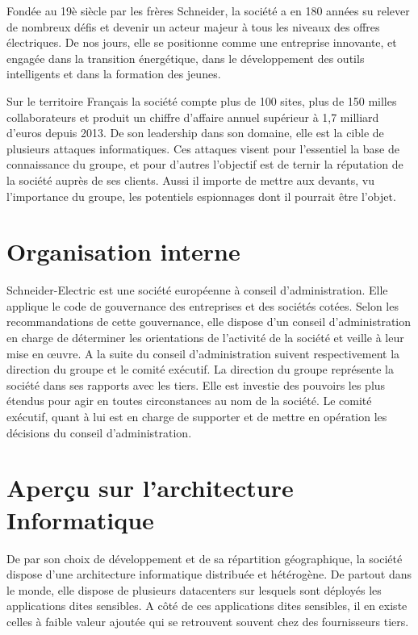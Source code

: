 \documentclass[a4paper,12pt]{book}
\theoremstyle{break}
\begin{document}
Fondée au 19è siècle par les frères Schneider, la société a en 180 années su relever de nombreux défis et devenir un acteur majeur à tous les niveaux des offres électriques. De nos jours, elle se positionne comme une entreprise innovante, et engagée dans la transition énergétique, dans le développement des outils intelligents et dans la formation des jeunes.


Sur le territoire Français la société compte plus de 100 sites, plus de 150 milles collaborateurs et produit un chiffre d'affaire annuel supérieur à 1,7 milliard d'euros depuis 2013.\newline
De son leadership dans son domaine, elle est la cible de plusieurs attaques informatiques. Ces attaques visent pour l’essentiel la base de connaissance du groupe, et pour d’autres l'objectif est de ternir la réputation de la société auprès de ses clients.
Aussi il importe de mettre aux devants, vu l'importance du groupe, les potentiels espionnages dont il pourrait être l'objet.


\section{Organisation interne}
Schneider-Electric est une société européenne à conseil d’administration. Elle applique le code de gouvernance des entreprises et des sociétés cotées. 
Selon les recommandations de cette gouvernance, elle dispose d’un conseil d’administration en charge de déterminer les orientations de l’activité de la société et veille à leur mise en œuvre. 
\newline 
A la suite du conseil d'administration suivent respectivement la direction du groupe et le comité exécutif. La direction du groupe représente la société dans ses rapports avec les tiers. Elle est investie des pouvoirs les plus étendus pour agir en toutes circonstances au nom de la société. 
\newline
Le comité exécutif, quant à lui est en charge de supporter et de mettre en opération les décisions du conseil d'administration. 

\section{Aperçu sur l'architecture Informatique}
De par son choix de développement et de sa répartition géographique, la société dispose d’une architecture informatique distribuée et hétérogène.
De partout dans le monde, elle dispose de plusieurs datacenters sur lesquels sont déployés les applications dites sensibles.
\newline
A côté de ces applications dites sensibles, il en existe celles à faible valeur ajoutée qui se retrouvent souvent chez des fournisseurs tiers.
\end{document}
